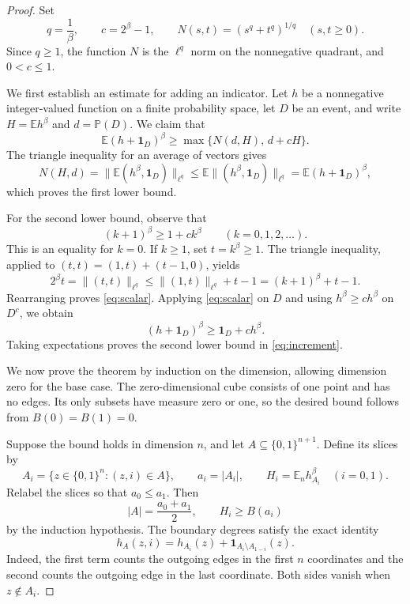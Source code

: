 \documentclass[11pt]{amsart}
\newcommand{\E}{\mathbb E}
\newcommand{\one}{\mathbf 1}
\begin{document}
\begin{proof}
Set
\[
 q=\frac1\beta,\qquad c=2^\beta-1,\qquad
 N(s,t)=(s^q+t^q)^{1/q}\quad(s,t\ge0).
\]
Since $q\ge1$, the function $N$ is the $\ell^q$ norm on the
nonnegative quadrant, and $0<c\le1$.

We first establish an estimate for adding an indicator. Let $h$ be
a nonnegative integer-valued function on a finite probability space,
let $D$ be an event, and write $H=\E h^\beta$ and $d=\mathbb P(D)$.
We claim that
\begin{equation}\label{eq:increment}
 \E(h+\one_D)^\beta\ge\max\{N(d,H),\,d+cH\}.
\end{equation}
The triangle inequality for an average of vectors gives
\[
 N(H,d)
 =\bigl\|\E(h^\beta,\one_D)\bigr\|_{\ell^q}
 \le \E\bigl\|(h^\beta,\one_D)\bigr\|_{\ell^q}
 =\E(h+\one_D)^\beta,
\]
which proves the first lower bound.

For the second lower bound, observe that
\begin{equation}\label{eq:scalar}
 (k+1)^\beta\ge1+ck^\beta
 \qquad(k=0,1,2,\ldots).
\end{equation}
This is an equality for $k=0$. If $k\ge1$, set $t=k^\beta\ge1$.
The triangle inequality, applied to $(t,t)=(1,t)+(t-1,0)$, yields
\[
 2^\beta t=\|(t,t)\|_{\ell^q}
 \le\|(1,t)\|_{\ell^q}+t-1
 =(k+1)^\beta+t-1.
\]
Rearranging proves \eqref{eq:scalar}. Applying \eqref{eq:scalar}
on $D$ and using $h^\beta\ge ch^\beta$ on $D^c$, we obtain
\[
 (h+\one_D)^\beta\ge\one_D+ch^\beta.
\]
Taking expectations proves the second lower bound in
\eqref{eq:increment}.

We now prove the theorem by induction on the dimension, allowing
dimension zero for the base case. The zero-dimensional cube consists
of one point and has no edges. Its only subsets have measure zero
or one, so the desired bound follows from $B(0)=B(1)=0$.

Suppose the bound holds in dimension $n$, and let
$A\subseteq\{0,1\}^{n+1}$. Define its slices by
\[
 A_i=\{z\in\{0,1\}^n:(z,i)\in A\},\qquad
 a_i=|A_i|,\qquad H_i=\E_n h_{A_i}^\beta
 \quad(i=0,1).
\]
Relabel the slices so that $a_0\le a_1$. Then
\[
 |A|=\frac{a_0+a_1}{2},
 \qquad H_i\ge B(a_i)
\]
by the induction hypothesis. The boundary degrees satisfy the exact
identity
\[
 h_A(z,i)=h_{A_i}(z)+\one_{A_i\setminus A_{1-i}}(z).
\]
Indeed, the first term counts the outgoing edges in the first $n$
coordinates and the second counts the outgoing edge in the last
coordinate. Both sides vanish when $z\notin A_i$.


\end{proof}
\end{document}
